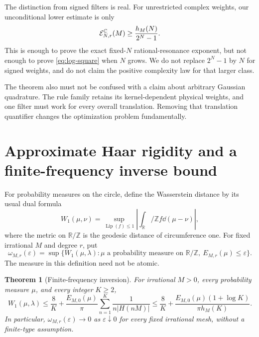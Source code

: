 \documentclass[11pt,a4paper]{article}
\numberwithin{equation}{section}
\theoremstyle{plain}
\newtheorem{theorem}{Theorem}[section]
\theoremstyle{definition}
\theoremstyle{remark}
\newcommand{\T}{\mathbb R/\mathbb Z}
\newcommand{\Err}{\mathcal E}
\begin{document}
The distinction from signed filters is real. For unrestricted complex weights,
our unconditional lower estimate is only
\begin{equation}\label{eq:signed-global}
 \Err^{\C}_{N,r}(M)\ge\frac{h_M(N)}{2^N-1}.
\end{equation}
This is enough to prove the exact fixed-$N$ rational-resonance exponent, but
not enough to prove \eqref{eq:log-square} when $N$ grows. We do not replace
$2^N-1$ by $N$ for signed weights, and do not claim the positive complexity
law for that larger class.

The theorem also must not be confused with a claim about arbitrary Gaussian
quadrature. The rule family retains its kernel-dependent physical weights,
and one filter must work for every overall translation. Removing that
translation quantifier changes the optimization problem fundamentally.

\section{Approximate Haar rigidity and a finite-frequency inverse bound}
\label{sec:inverse}

For probability measures on the circle, define the Wasserstein distance by
its usual dual formula
\begin{equation}\label{eq:W1}
 W_1(\mu,\nu)=\sup_{\operatorname{Lip}(f)\le1}
 \left|\int_\T f\dd(\mu-\nu)\right|,
\end{equation}
where the metric on $\T$ is the geodesic distance of circumference one.
For fixed irrational $M$ and degree $r$, put
\begin{equation}\label{eq:omega}
 \omega_{M,r}(\varepsilon)=
 \sup\{W_1(\mu,\lambda):\mu\text{ a probability measure on }\T,
 \ E_{M,r}(\mu)\le\varepsilon\}.
\end{equation}
The measure in this definition need not be atomic.

\begin{theorem}[Finite-frequency inversion]\label{thm:inversion}
For irrational $M>0$, every probability measure $\mu$, and every integer
$K\ge2$,
\begin{equation}\label{eq:inverse}
 W_1(\mu,\lambda)
 \le\frac8K+
 \frac{E_{M,0}(\mu)}\pi
 \sum_{n=1}^K\frac1{n|H(nM)|}
 \le\frac8K+
 \frac{E_{M,0}(\mu)(1+\log K)}{\pi h_M(K)}.
\end{equation}
In particular, $\omega_{M,r}(\varepsilon)\to0$ as $\varepsilon\downarrow0$
for every fixed irrational mesh, without a finite-type assumption.
\end{theorem}
\end{document}
